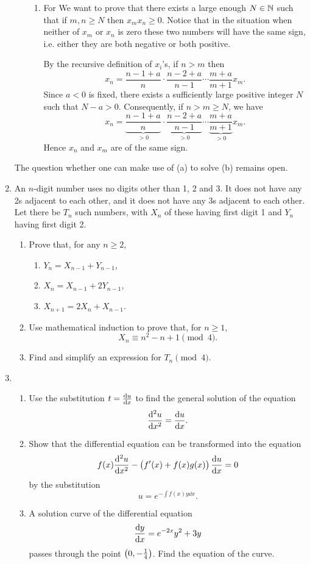 \begin{enumerate}
\begin{solution}
\begin{enumerate}[label=(\roman*)]
\begin{enumerate}[label=(\alph*)]
\item For We want to prove that there exists a large enough $N\in\mathbb N$ such that if $m,n\ge N$ then $x_mx_n\ge0$. Notice that in the situation when neither of $x_m$ or $x_n$ is zero these two numbers will have the same sign, i.e. either they are both negative or both positive.

By the recursive definition of $x_i$'s, if $n>m$ then
\[ x_n=\frac{n-1+a}{n}\cdot\frac{n-2+a}{n-1}\cdots\frac{m+a}{m+1}x_m. \]
Since $a<0$ is fixed, there exists a sufficiently large positive integer $N$ such that $N-a>0$. Consequently, if $n>m\ge N$, we have 
\[ x_n=\underbrace{\frac{n-1+a}{n}}_{>0}\cdot\underbrace{\frac{n-2+a}{n-1}}_{>0}\cdots\underbrace{\frac{m+a}{m+1}}_{>0}x_m. \]
Hence $x_n$ and $x_m$ are of the same sign.
\end{enumerate}
\end{enumerate}
\end{solution}

\begin{remark}
The question whether one can make use of (a) to solve (b) remains open.
\end{remark}

\item An $n$-digit number uses no digits other than 1, 2 and 3. It does not have any 2s adjacent to each other, and it does not have any 3s adjacent to each other. Let there be $T_n$ such numbers, with $X_n$ of these having first digit 1 and $Y_n$ having first digit 2.
\begin{enumerate}[label=(\alph*)]
\item Prove that, for any $n\ge2$,
\begin{enumerate}[label=(\roman*)]
    \item $Y_n=X_{n-1}+Y_{n-1}$,
    \item $X_n=X_{n-1}+2Y_{n-1}$,
    \item $X_{n+1}=2X_n+X_{n-1}$.
\end{enumerate}
\item Use mathematical induction to prove that, for $n\ge1$,
\[ X_n\equiv n^2-n+1\pmod 4. \]
\item Find and simplify an expression for $T_n\pmod4$.
\end{enumerate}

\item \begin{enumerate}[label=(\roman*)]
\item Use the substitution $t=\dv{u}{x}$ to find the general solution of the equation
\[ \dv[2]{u}{x}=\dv{u}{x}. \]
\item Show that the differential equation can be transformed into the equation
\[ f(x)\dv[2]{u}{x}-\left(f^\prime(x)+f(x)g(x)\right)\dv{u}{x}=0 \]
by the substitution
\[ u=e^{-\int f(x)y\dd{x}}. \]
\item A solution curve of the differential equation
\[ \dv{y}{x}=e^{-2x}y^2+3y \]
passes through the point $\left(0,-\frac{1}{4}\right)$. Find the equation of the curve.
\end{enumerate}
\end{enumerate}
\pagebreak

